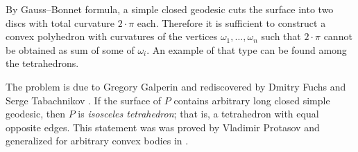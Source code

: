 By Gauss--Bonnet formula, a simple closed geodesic cuts the surface into two discs with total curvature $2\cdot\pi$ each.
Therefore it is sufficient to construct a convex polyhedron with curvatures of the vertices $\omega_1,\dots,\omega_n$ such that
$2\cdot\pi$ cannot be obtained as sum of some of $\omega_i$.
An example of that type can be found among the tetrahedrons.
\qeds

The problem is due to Gregory Galperin \cite[see][]{galperin} 
and rediscovered by Dmitry Fuchs and Serge Tabachnikov \cite[see 20.8 in][]{fuchs-tabachnikov}.
If the surface of $P$ contains arbitrary long closed simple geodesic, 
then $P$ is \emph{isosceles tetrahedron};
that is, a tetrahedron with equal opposite edges.
This statement was was proved by Vladimir Protasov \cite[see][]{protasov}
and generalized for arbitrary convex bodies in \cite{akopyan-petrunin}.

